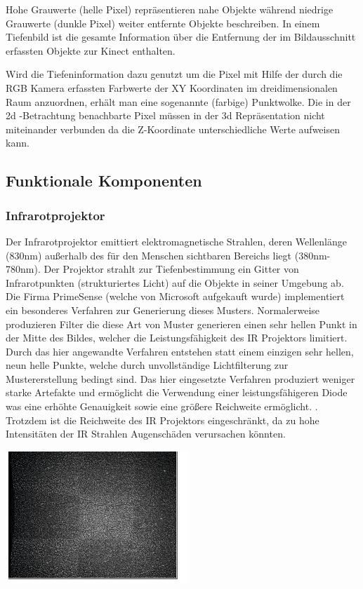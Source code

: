 Hohe Grauwerte (helle Pixel) repräsentieren nahe Objekte während niedrige Grauwerte (dunkle Pixel) weiter entfernte Objekte beschreiben. In einem Tiefenbild ist die gesamte Information über die Entfernung der im Bildausschnitt erfassten Objekte zur Kinect enthalten.

Wird die Tiefeninformation dazu genutzt um die Pixel mit Hilfe der durch die RGB Kamera erfassten Farbwerte der XY Koordinaten im dreidimensionalen Raum anzuordnen, erhält man eine sogenannte (farbige) Punktwolke. Die in der 2d 
-Betrachtung benachbarte Pixel müssen in der 3d Repräsentation nicht miteinander verbunden da die Z-Koordinate unterschiedliche Werte aufweisen kann.
\subsection{Funktionale Komponenten}
\subsubsection{Infrarotprojektor}

Der Infrarotprojektor emittiert elektromagnetische Strahlen, deren Wellenlänge (830nm) außerhalb des für den Menschen sichtbaren Bereichs liegt (380nm-780nm).
Der Projektor strahlt zur Tiefenbestimmung ein Gitter von Infrarotpunkten (strukturiertes Licht) auf die Objekte in seiner Umgebung ab. 
Die Firma PrimeSense (welche von Microsoft aufgekauft wurde) implementiert ein besonderes Verfahren zur Generierung dieses Musters.
Normalerweise produzieren Filter die diese Art von Muster generieren einen sehr hellen Punkt in der Mitte des Bildes, welcher die Leistungsfähigkeit des IR Projektors limitiert.\\


Durch das hier angewandte Verfahren entstehen statt einem einzigen sehr hellen, neun helle Punkte, welche durch unvollständige Lichtfilterung zur Mustererstellung bedingt sind. Das hier eingesetzte Verfahren produziert weniger starke Artefakte und ermöglicht die Verwendung einer leistungsfähigeren Diode was eine erhöhte Genauigkeit sowie eine größere Reichweite ermöglicht. . Trotzdem ist die Reichweite des IR Projektors eingeschränkt, da zu hohe Intensitäten der IR Strahlen Augenschäden verursachen könnten.


\includegraphics[height=5cm]{Res/9_Dots.png}



